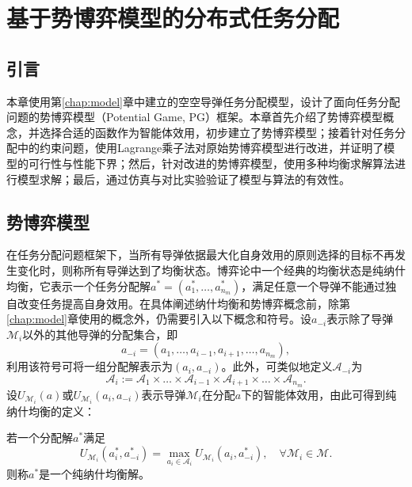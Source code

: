 
\chapter{基于势博弈模型的分布式任务分配}
\label{chap:pg}



\section{引言}
\label{pg:intro}

本章使用第\ref{chap:model}章中建立的空空导弹任务分配模型，设计了面向任务分配问题的势博弈模型（Potential Game, PG）框架。本章首先介绍了势博弈模型概念，并选择合适的函数作为智能体效用，初步建立了势博弈模型；接着针对任务分配中的约束问题，使用Lagrange乘子法对原始势博弈模型进行改进，并证明了模型的可行性与性能下界；然后，针对改进的势博弈模型，使用多种均衡求解算法进行模型求解；最后，通过仿真与对比实验验证了模型与算法的有效性。

\section{势博弈模型}
\label{pg:model}
在任务分配问题框架下，当所有导弹依据最大化自身效用的原则选择的目标不再发生变化时，则称所有导弹达到了均衡状态。博弈论中一个经典的均衡状态是纯纳什均衡，它表示一个任务分配解$a^*=(a_1^*,\dots,a_{n_m}^*)$，满足任意一个导弹不能通过独自改变任务提高自身效用。在具体阐述纳什均衡和势博弈概念前，除第\ref{chap:model}章使用的概念外，仍需要引入以下概念和符号。设$a_{-i}$表示除了导弹$\mathcal{M}_i$以外的其他导弹的分配集合，即
\[
a_{-i}=(a_1,\dots,a_{i-1},a_{i+1},\dots,a_{n_m}),
\]
利用该符号可将一组分配解表示为$(a_i,a_{-i})$。此外，可类似地定义$\mathcal{A}_{-i}$为
\[
\mathcal{A}_i:=\mathcal{A}_1 \times \dots \times \mathcal{A}_{i-1} \times \mathcal{A}_{i+1} \times \dots \times \mathcal{A}_{n_m} .
\]
设$U_{\mathcal{M}_i}(a)$或$U_{\mathcal{M}_i}(a_i,a_{-i})$表示导弹$\mathcal{M}_i$在分配$a$下的智能体效用，由此可得到纯纳什均衡的定义：
\begin{definition}[纯纳什均衡]
\label{pg:def:pureNash}
	若一个分配解$a^*$满足
	\begin{equation}
\label{pg:eq:pure_Nash}
	U_{\mathcal{M}_i}(a_i^*,a_{-i}^*)=\max_{a_i\in \mathcal{A}_i}U_{\mathcal{M}_i}(a_i,a_{-i}^*),\quad \forall \mathcal{M}_i \in \mathcal{M}.
\end{equation}
则称$a^*$是一个纯纳什均衡解。
\end{definition}

